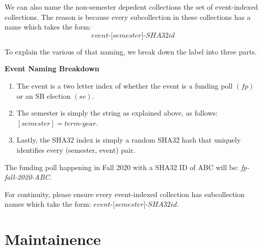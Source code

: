 \documentclass[a4paper]{article}
\begin{document}
%

\begin{note*} We can also name the non-semester depedent collections the set of event-indexed collections. The reason is because every subcollection in these collections has a name which takes the form:
$$\textit{event-[semester]-SHA32id}$$
\end{note*}

\noindent To explain the various of that naming, we break down the label into three parts.

\begin{center}
\textbf{Event Naming Breakdown}
\end{center}
\begin{enumerate}
  \item The event is a two letter index of whether the event is a funding poll $(fp)$ or an SB election $(se)$.
  \item The semester is simply the string as explained above, as follows: $[semester] = \textit{term-year}$.
  \item Lastly, the SHA32 index is simply a random SHA32 hash that uniquely identifies every (semester, event) pair.
\end{enumerate}

\begin{example*}
The funding poll happening in Fall 2020 with a SHA32 ID of ABC will be: \textit{fp-fall-2020-ABC}.
\end{example*}
For continuity, please ensure every event-indexed collection has subcollection names which take the form: $\textit{event-[semester]-SHA32id}$.


\newpage
\section{Maintainence}
\end{document}
